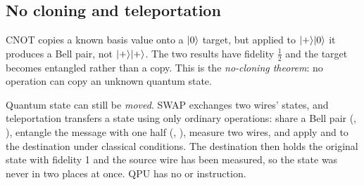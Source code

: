\subsection{No cloning and teleportation}

CNOT copies a known basis value onto a $\lvert 0\rangle$ target, but applied to
$\lvert +\rangle\lvert 0\rangle$ it produces a Bell pair, not $\lvert +\rangle\lvert +\rangle$. The two results have
fidelity $\tfrac12$ and the target becomes entangled rather than a copy. This
is the \emph{no-cloning theorem}: no operation can copy an unknown quantum
state.

Quantum state can still be \emph{moved}. SWAP exchanges two wires' states, and
teleportation transfers a state using only ordinary operations: share a Bell
pair (, ), entangle the message with one half (,
), measure two wires, and apply  and  to the
destination under classical  conditions. The destination then holds
the original state with fidelity 1 and the source wire has been measured, so
the state was never in two places at once. QPU has no  or
 instruction.
